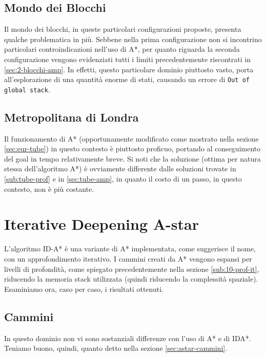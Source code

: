 \subsection{Mondo dei Blocchi} \label{sec:astar-blocchi}
Il mondo dei blocchi, in queste particolari configurazioni proposte, presenta qualche problematica in più. Sebbene nella prima configurazione non si incontrino particolari controindicazioni nell'uso di A*, per quanto riguarda la seconda configurazione vengono evidenziati tutti i limiti precedentemente riscontrati in \ref{sec:2-blocchi-amp}. In effetti, questo particolare dominio piuttosto vasto, porta all'esplorazione di una quantità enorme di stati, causando un errore di \texttt{Out of global stack}.

\subsection{Metropolitana di Londra}
Il funzionamento di A* (opportunamente modificato come mostrato nella sezione \ref{sec:eur-tube}) in questo contesto è piuttosto proficuo, portando al conseguimento del goal in tempo relativamente breve. Si noti che la soluzione (ottima per natura stessa dell'algoritmo A*) è ovviamente differente dalle soluzioni trovate in \ref{sub:tube-prof} e in \ref{sec:tube-amp}, in quanto il costo di un passo, in questo contesto, non è più costante.
\section{Iterative Deepening A-star} \label{sec:idastar}
L'algoritmo ID-A* è una variante di A* implementata, come suggerisce il nome, con un approfondimento iterativo. I cammini creati da A* vengono espansi per livelli di profondità, come spiegato precedentemente nella sezione \ref{sub:10-prof-it}, riducendo la memoria stack utilizzata (quindi riducendo la complessità spaziale). Esaminiamo ora, caso per caso, i risultati ottenuti.

\subsection{Cammini}
In questo dominio non vi sono sostanziali differenze con l'uso di A* e di IDA*. Teniamo buono, quindi, quanto detto nella sezione \ref{sec:astar-cammini}.

